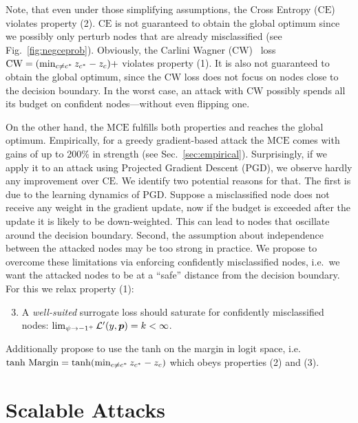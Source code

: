 \documentclass[sigconf, review]{acmart}
\begin{document}
Note, that even under those simplifying assumptions, the Cross Entropy (\(\text{CE}\)) violates property (2). \(\text{CE}\) is not guaranteed to obtain the global optimum since we possibly only perturb nodes that are already misclassified (see Fig.~\ref{fig:negceprob}). Obviously, the Carlini Wagner (\(\text{CW}\))~\cite{Carlini2017} loss \(\text{CW} = (\min_{c \ne c^*} {z}_{c^*} - {z}_{c})+\) violates property (1). It is also not guaranteed to obtain the global optimum, since the \(\text{CW}\) loss does not focus on nodes close to the decision boundary. In the worst case, an attack with \(\text{CW}\) possibly spends all its budget on confident nodes---without even flipping one.

On the other hand, the \(\text{MCE}\) fulfills both properties and reaches the global optimum. Empirically, for a greedy gradient-based attack the \(\text{MCE}\) comes with gains of up to 200\% in strength (see Sec.~\ref{sec:empirical}). Surprisingly, if we apply it to an attack using Projected Gradient Descent (PGD), we observe hardly any improvement over \(\text{CE}\). We identify two potential reasons for that. The first is due to the learning dynamics of PGD. Suppose a misclassified node does not receive any weight in the gradient update, now if the budget is exceeded after the update it is likely to be down-weighted. This can lead to nodes that oscillate around the decision boundary. Second, the assumption about independence between the attacked nodes may be too strong in practice. We propose to  overcome these limitations via enforcing confidently misclassified nodes, i.e.\ we want the attacked nodes to be at a ``safe'' distance from the decision boundary. For this we relax property (1):
\begin{enumerate}
  \setcounter{enumi}{2}
  \item A \emph{well-suited} surrogate loss should saturate for confidently misclassified nodes: \(\lim_{\psi \to -1^+} \mathcal{L}'(y, {\bm{p}}) = k < \infty\).
\end{enumerate}
Additionally propose to use the tanh on the margin in logit space, i.e. \(\text{tanh Margin} = \tanh(\min_{c \ne c^*} {z}_{c^*} - {z}_{c})\) which obeys properties (2) and (3).

\section{Scalable Attacks}\label{sec:attack}
\end{document}
